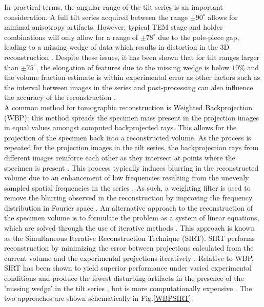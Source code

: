 In practical terms, the angular range of the tilt series is an important consideration. A full tilt series acquired between the range $\pm 90^{\circ}$ allows for minimal anisotropy artifacts. However, typical TEM stage and holder combinations will only allow for a range of $\pm 78^{\circ}$ due to the pole-piece gap, leading to a missing wedge of data which results in distortion in the 3D reconstruction \cite{Mobus2007}. Despite these issues, it has been shown that for tilt ranges larger than $\pm 75^{\circ}$, the elongation of features due to the missing wedge is below $10 \%$ and the volume fraction estimate is within experimental error as other factors such as the interval between images in the series and post-processing can also influence the accuracy of the reconstruction \cite{Kawase2007}. \\
A common method for tomographic reconstruction is Weighted Backprojection (WBP): this method spreads the specimen mass present in the projection images in equal values amongst computed backprojected rays. This allows for the projection of the specimen back into a reconstructed volume. As the process is repeated for the projection images in the tilt series, the backprojection rays from different images reinforce each other as they intersect at points where the specimen is present \cite{Fernandez2010}. This process typically induces blurring in the reconstructed volume due to an enhancement of low frequencies resulting from the unevenly sampled spatial frequencies in the series \cite{Midgley2003}. As such, a weighting filter is used to remove the blurring observed in the reconstruction by improving the frequency distribution in Fourier space \cite{Midgley2003}. An alternative approach to the reconstruction of the specimen volume is to formulate the problem as a system of linear equations, which are solved through the use of iterative methods \cite{Gilbert1972}. This approach is known as the Simultaneous Iterative Reconstruction Technique (SIRT). SIRT performs reconstruction by minimizing the error between projections calculated from the current volume and the experimental projections iteratively \cite{Fernandez2010}. Relative to WBP, SIRT has been shown to yield superior performance under varied experimental conditions and produce the fewest disturbing artifacts in the presence of the 'missing wedge' in the tilt series  \cite{Penczek2010}, but is more computationally expensive \cite{Fernandez2010}. The two approaches are shown schematically in Fig.\ref{WBPSIRT}.

